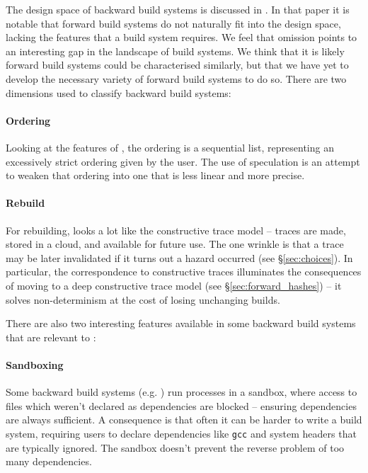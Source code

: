 The design space of backward build systems is discussed in \cite{build_systems_a_la_carte}. In that paper it is notable that forward build systems do not naturally fit into the design space, lacking the features that a build system requires. We feel that omission points to an interesting gap in the landscape of build systems. We think that it is likely forward build systems could be characterised similarly, but that we have yet to develop the necessary variety of forward build systems to do so. There are two dimensions used to classify backward build systems:

\paragraph{Ordering} Looking at the features of \Rattle, the ordering is a sequential list, representing an excessively strict ordering given by the user. The use of speculation is an attempt to weaken that ordering into one that is less linear and more precise.

\paragraph{Rebuild} For rebuilding, \Rattle looks a lot like the constructive trace model -- traces are made, stored in a cloud, and available for future use. The one wrinkle is that a trace may be later invalidated if it turns out a hazard occurred (see \S\ref{sec:choices}). In particular, the correspondence to constructive traces illuminates the consequences of moving to a deep constructive trace model (see \S\ref{sec:forward_hashes}) -- it solves non-determinism at the cost of losing unchanging builds.

\postparagraphs

There are also two interesting features available in some backward build systems that are relevant to \Rattle:

\paragraph{Sandboxing} Some backward build systems (e.g. \Bazel \cite{bazel}) run processes in a sandbox, where access to files which weren't declared as dependencies are blocked -- ensuring dependencies are always sufficient. A consequence is that often it can be harder to write a \Bazel build system, requiring users to declare dependencies like \texttt{gcc} and system headers that are typically ignored. The sandbox doesn't prevent the reverse problem of too many dependencies.


